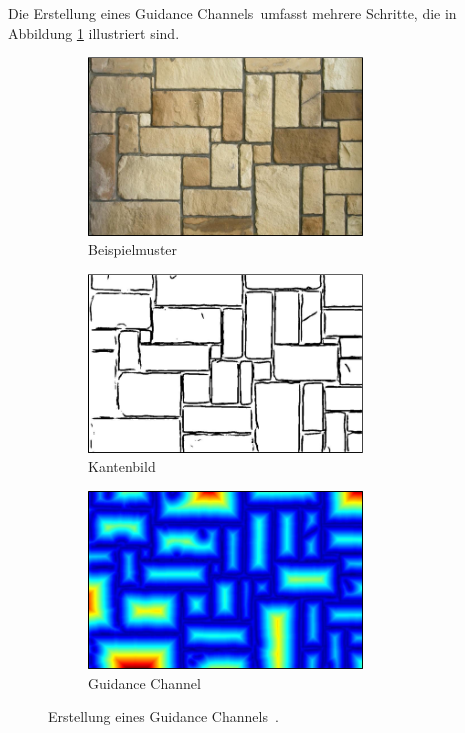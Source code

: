 Die Erstellung eines \glqq Guidance Channels\grqq \ umfasst mehrere Schritte, die in Abbildung \ref{Guidance Channel} illustriert sind.

\begin{figure}
	\centering
	\begin{subfigure}{0.3\textwidth}
		\centering
		\includegraphics[width=0.8\textwidth]{images/guidance-channel-1}
		\caption{Beispielmuster}
	\end{subfigure}
	\hfill
	\begin{subfigure}{0.3\textwidth}
		\centering
		\includegraphics[width=0.8\textwidth]{images/guidance-channel-2}
		\caption{Kantenbild}
	\end{subfigure}
	\hfill
	\begin{subfigure}{0.3\textwidth}
		\centering
		\includegraphics[width=0.8\textwidth]{images/guidance-channel-3}
		\caption{\glqq Guidance Channel\grqq}
	\end{subfigure}
	
	\caption{Erstellung eines \glqq Guidance Channels\grqq \ \cite{SelfTuning}.}
	\label{Guidance Channel}
\end{figure}

